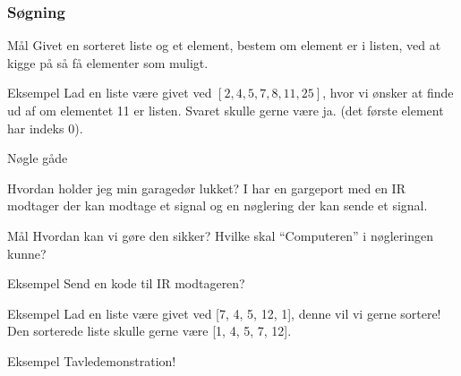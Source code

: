 \documentclass[12pt,t]{beamer}
\begin{document}
    \begin{frame}
      \frametitle{Søgning}
      \begin{block}{Mål}
      Givet en sorteret liste og et element, bestem om element er i listen,
      ved at kigge på så få elementer som muligt.
      \end{block}
      \pause{}
      \begin{exampleblock}{Eksempel}
      Lad en liste være givet ved $[2, 4, 5, 7, 8, 11, 25]$, hvor vi ønsker at
      finde ud af om elementet 11 er listen. Svaret skulle gerne være ja.
      (det første element har indeks 0).
      \end{exampleblock}
    \end{frame}


      \begin{frame}{Nøgle gåde}
      \begin{block}{Hvordan holder jeg min garagedør lukket?}
          I har en gargeport med en IR modtager der kan modtage et
          signal og en nøglering der kan sende et signal.
      \end{block}\pause{}
        \begin{block}{Mål}
          Hvordan kan vi gøre den sikker? Hvilke skal ``Computeren'' i
          nøgleringen kunne?
        \end{block}
        \pause{}
        \begin{exampleblock}{Eksempel}
          Send en kode til IR modtageren?
        \end{exampleblock}
      \end{frame}


    \begin{frame}
      \begin{exampleblock}{Eksempel}
      Lad en liste være givet ved [7, 4, 5, 12, 1], denne vil vi gerne sortere!
      Den sorterede liste skulle gerne være [1, 4, 5, 7, 12].
      \end{exampleblock}
      \begin{exampleblock}{Eksempel}
          Tavledemonstration!
      \end{exampleblock}
    \end{frame}
\end{document}
